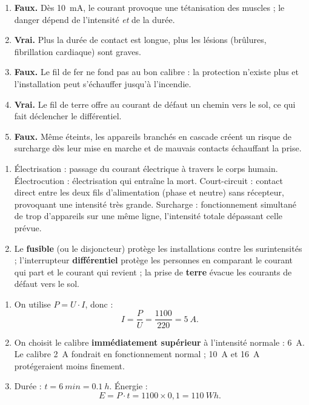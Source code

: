 \documentclass[11pt]{article}
\newcommand{\cle}[1]{{\popxbold\color{popdark}#1}}
\begin{document}
\begin{corrige}
\begin{enumerate}
\item \textbf{Faux.} Dès \SI{10}{mA}, le courant provoque une tétanisation des muscles ; le danger dépend de l'intensité \emph{et} de la durée.
\item \textbf{Vrai.} Plus la durée de contact est longue, plus les lésions (brûlures, fibrillation cardiaque) sont graves.
\item \textbf{Faux.} Le fil de fer ne fond pas au bon calibre : la protection n'existe plus et l'installation peut s'échauffer jusqu'à l'incendie.
\item \textbf{Vrai.} Le fil de terre offre au courant de défaut un chemin vers le sol, ce qui fait déclencher le différentiel.
\item \textbf{Faux.} Même éteints, les appareils branchés en cascade créent un risque de surcharge dès leur mise en marche et de mauvais contacts échauffant la prise.
\end{enumerate}
\end{corrige}

\begin{corrige}
\begin{enumerate}
\item \cle{Électrisation} : passage du courant électrique à travers le corps humain. \cle{Électrocution} : électrisation qui entraîne la mort. \cle{Court-circuit} : contact direct entre les deux fils d'alimentation (phase et neutre) sans récepteur, provoquant une intensité très grande. \cle{Surcharge} : fonctionnement simultané de trop d'appareils sur une même ligne, l'intensité totale dépassant celle prévue.
\item Le \textbf{fusible} (ou le disjoncteur) protège les installations contre les surintensités ; l'interrupteur \textbf{différentiel} protège les personnes en comparant le courant qui part et le courant qui revient ; la prise de \textbf{terre} évacue les courants de défaut vers le sol.
\end{enumerate}
\end{corrige}

\begin{corrige}
\begin{enumerate}
\item On utilise $P = U \cdot I$, donc :
\[ I = \frac{P}{U} = \frac{1100}{220} = \SI{5}{A}. \]
\item On choisit le calibre \textbf{immédiatement supérieur} à l'intensité normale : \SI{6}{A}. Le calibre \SI{2}{A} fondrait en fonctionnement normal ; \SI{10}{A} et \SI{16}{A} protégeraient moins finement.
\item Durée : $t = \SI{6}{min} = \SI{0,1}{h}$. Énergie :
\[ E = P \cdot t = 1100 \times 0,1 = \SI{110}{Wh}. \]
\end{enumerate}
\end{corrige}
\end{document}

